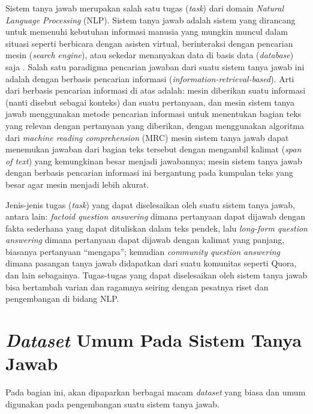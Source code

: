 Sistem tanya jawab merupakan salah satu tugas (\emph{task}) dari domain \emph{Natural Language Processing} (NLP). Sistem tanya jawab adalah sistem yang dirancang untuk memenuhi kebutuhan informasi manusia yang mungkin muncul dalam situasi seperti berbicara dengan asisten virtual, berinteraksi dengan pencarian mesin (\emph{search engine}), atau sekedar menanyakan data di basis data (\emph{database}) saja \citep{daniel2007speech}. Salah satu paradigma pencarian jawaban dari suatu sistem tanya jawab ini adalah dengan berbasis pencarian informasi (\emph{information-retrieval-based}). Arti dari berbasis pencarian informasi di atas adalah: mesin diberikan suatu informasi (nanti disebut sebagai konteks) dan suatu pertanyaan, dan mesin sistem tanya jawab menggunakan metode pencarian informasi untuk menentukan bagian teks yang relevan dengan pertanyaan yang diberikan, dengan menggunakan algoritma dari \emph{machine reading comprehension} (MRC) mesin sistem tanya jawab dapat menemukan jawaban dari bagian teks tersebut dengan mengambil kalimat (\emph{span of text}) yang kemungkinan besar menjadi jawabannya; mesin sistem tanya jawab dengan berbasis pencarian informasi ini bergantung pada kumpulan teks yang besar agar mesin menjadi lebih akurat. 

Jenis-jenis tugas (\emph{task}) yang dapat diselesaikan oleh suatu sistem tanya jawab, antara lain: \emph{factoid question answering} dimana pertanyaan dapat dijawab dengan fakta sederhana yang dapat dituliskan dalam teks pendek, lalu \emph{long-form question answering} dimana pertanyaan dapat dijawab dengan kalimat yang panjang, biasanya pertanyaan “mengapa”; kemudian \emph{community question answering} dimana pasangan tanya jawab didapatkan dari suatu komunitas seperti Quora, dan lain sebagainya. Tugas-tugas yang dapat diselesaikan oleh sistem tanya jawab bisa bertambah varian dan ragamnya seiring dengan pesatnya riset dan pengembangan di bidang NLP.

\section{\emph{Dataset} Umum Pada Sistem Tanya Jawab}
Pada bagian ini, akan dipaparkan berbagai macam \emph{dataset} yang biasa dan umum digunakan pada pengembangan suatu sistem tanya jawab.

